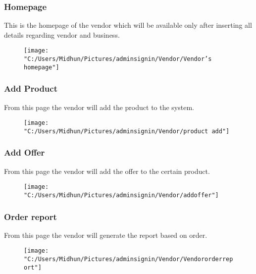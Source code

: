 \documentclass{beamer}
\begin{document}
\begin{frame}
\subsubsection{Homepage}
This is the homepage of the vendor which will be available only after inserting all details regarding vendor and business. 
\begin{figure}[bph]
	\centering
	\texttt{[image: "C:/Users/Midhun/Pictures/adminsignin/Vendor/Vendor's homepage"]}
	\label{fig:admin-signin}
\end{figure}
	
	
\end{frame}
\begin{frame}
	\subsubsection{Add Product}
	From this page the vendor will add the product to the system.
	\begin{figure}[bph]
		\centering
		\texttt{[image: "C:/Users/Midhun/Pictures/adminsignin/Vendor/product add"]}
		\label{fig:admin-signin}
	\end{figure}
	
	
\end{frame}
\begin{frame}
	\subsubsection{Add Offer}
	From this page the vendor will add the offer to the certain product.
	\begin{figure}[bph]
		\centering
		\texttt{[image: "C:/Users/Midhun/Pictures/adminsignin/Vendor/addoffer"]}
		\label{fig:admin-signin}
	\end{figure}
	
	
\end{frame}
\begin{frame}
	\subsubsection{Order report}
	From this page the vendor will generate the report based on order.
	\begin{figure}[bph]
		\centering
		\texttt{[image: "C:/Users/Midhun/Pictures/adminsignin/Vendor/Vendororderreport"]}
		\label{fig:admin-signin}
	\end{figure}
	
	
\end{frame}
\end{document}

